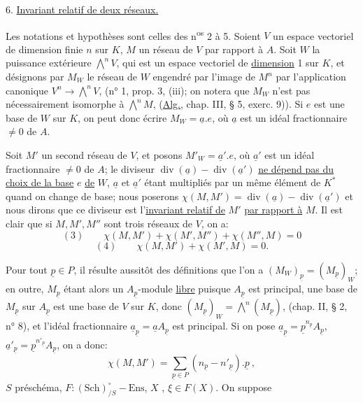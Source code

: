 6. \uline{Invariant relatif de deux réseaux.}

Les notations et hypothèses sont celles des n\textsuperscript{os} 2 à 5. Soient $V$ un espace vectoriel de dimension finie $n$ sur $K$, $M$ un réseau de $V$ par rapport à $A$. Soit $W$ la puissance extérieure $\overset{n}{\bigwedge}V$, qui est un espace vectoriel de \uline{dimension} 1 sur $K$, et désignons par $M_W$ le réseau de $W$ engendré par l'image de $M^n$ par l'application canonique $V^n\to\overset{n}{\bigwedge}V$, (n° 1, prop. 3, (iii); on notera que $M_W$ n'est pas nécessairement isomorphe à $\overset{n}{\bigwedge}M$, (\uline{Alg.}, chap. III, § 5, exerc. 9)). Si $e$ est une base de $W$ sur $K$, on peut donc écrire $M_W=\underline a.e$, où $\underline a$ est un idéal fractionnaire $\ne0$ de $A$.

Soit $M'$ un second réseau de $V$, et posons $M'_W=\underline a'.e$, où $\underline a'$ est un idéal fractionnaire $\ne0$ de $A$; le diviseur $\operatorname{div}(\underline a)-\operatorname{div}(\underline a')$ \uline{ne dépend pas du choix de la base} $e$ \uline{de} $W$, $\underline a$ et $\underline a'$ étant multipliés par un même élément de $K^*$ quand on change de base; nous poserons $\chi(M,M')=\operatorname{div}(\underline a)-\operatorname{div}(\underline a')$ et nous dirons que ce diviseur est l'\uline{invariant relatif de} $M'$ \uline{par rapport à} $M$. Il est clair que si $M,M',M''$ sont trois réseaux de $V$, on a:
\[
(3)\qquad\chi(M,M')+\chi(M',M'')+\chi(M'',M)=0
\]
\[
(4)\qquad\chi(M,M')+\chi(M',M)=0.
\]

Pour tout $\underline p\in P$, il résulte aussitôt des définitions que l'on a $(M_W)_{\underline p}=(M_{\underline p})_W$; en outre, $M_{\underline p}$ étant alors un $A_{\underline p}$-module \uline{libre} puisque $A_{\underline p}$ est principal, une base de $M_{\underline p}$ sur $A_{\underline p}$ est une base de $V$ sur $K$, donc $(M_{\underline p})_W=\overset{n}{\bigwedge}(M_{\underline p})$, (chap. II, § 2, n° 8), et l'idéal fractionnaire $\underline a_{\underline p}=\underline a A_{\underline p}$ est principal. Si on pose $\underline a_{\underline p}=\underline p^{n_{\underline p}}A_{\underline p}$, $\underline a'_{\underline p}=\underline p^{n'_{\underline p}}A_{\underline p}$, on a donc:
\[
\chi(M,M')=\sum_{\underline p\in P}(n_{\underline p}-n'_{\underline p}).\underline p\ ,
\]
  $S$ préschéma, $F:(\mathrm{Sch})_{/S}^{\circ}\mathbin{-}\mathrm{Ens}$, $X$  , $\xi\in F(X)$. On suppose


